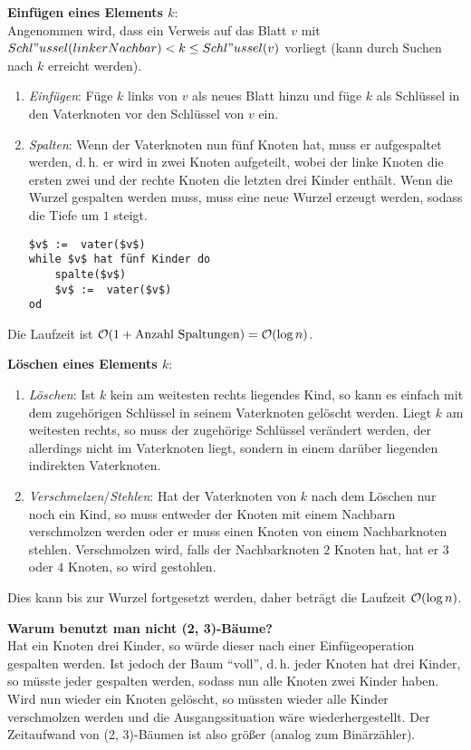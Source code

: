 \textbf{Einfügen eines Elements $k$}: \\
Angenommen wird, dass ein Verweis auf das Blatt $v$ mit
$Schl"ussel(linkerNachbar) < k \le Schl"ussel(v)$ vorliegt
(kann durch Suchen nach $k$ erreicht werden).
\begin{enumerate}
    \item
    \emph{Einfügen}:
    Füge $k$ links von $v$ als neues Blatt hinzu und füge $k$ als Schlüssel
    in den Vaterknoten vor den Schlüssel von $v$ ein.

    \item
    \emph{Spalten}:
    Wenn der Vaterknoten nun fünf Knoten hat, muss er aufgespaltet werden,
    d.\,h. er wird in zwei Knoten aufgeteilt, wobei der linke
    Knoten die ersten zwei und der rechte Knoten die letzten drei
    Kinder enthält.
    Wenn die Wurzel gespalten werden muss, muss eine neue Wurzel erzeugt
    werden, sodass die Tiefe um $1$ steigt.
    \begin{lstlisting}
$v$ :=  vater($v$)
while $v$ hat fünf Kinder do
    spalte($v$)
    $v$ :=  vater($v$)
od
    \end{lstlisting}
\end{enumerate}
Die Laufzeit ist $\mathcal{O}(1 + \text{Anzahl Spaltungen}) = \mathcal{O}(\log n)$.

\linie

\textbf{Löschen eines Elements $k$}:
\begin{enumerate}
    \item
    \emph{Löschen}:
    Ist $k$ kein am weitesten rechts liegendes Kind, so kann es einfach
    mit dem zugehörigen Schlüssel in seinem Vaterknoten gelöscht werden.
    Liegt $k$ am weitesten rechts, so muss der zugehörige Schlüssel
    verändert werden, der allerdings nicht im Vaterknoten liegt, sondern
    in einem darüber liegenden indirekten Vaterknoten.

    \item
    \emph{Verschmelzen}/\emph{Stehlen}:
    Hat der Vaterknoten von $k$ nach dem Löschen nur noch ein Kind, so
    muss entweder der Knoten mit einem Nachbarn verschmolzen werden oder
    er muss einen Knoten von einem Nachbarknoten stehlen.
    Verschmolzen wird, falls der Nachbarknoten $2$ Knoten hat, hat er
    $3$ oder $4$ Knoten, so wird gestohlen.
\end{enumerate}
Dies kann bis zur Wurzel fortgesetzt werden, daher beträgt die Laufzeit
$\mathcal{O}(\log n)$.

\linie

\textbf{Warum benutzt man nicht (2, 3)-Bäume?} \\
Hat ein Knoten drei Kinder, so würde dieser nach einer Einfügeoperation
gespalten werden.
Ist jedoch der Baum "`voll"', d.\,h. jeder Knoten hat drei Kinder,
so müsste jeder gespalten werden, sodass nun alle Knoten zwei Kinder haben.
Wird nun wieder ein Knoten gelöscht, so müssten wieder alle Kinder verschmolzen
werden und die Ausgangssituation wäre wiederhergestellt.
Der Zeitaufwand von (2, 3)-Bäumen ist also größer
(analog zum Binärzähler).

